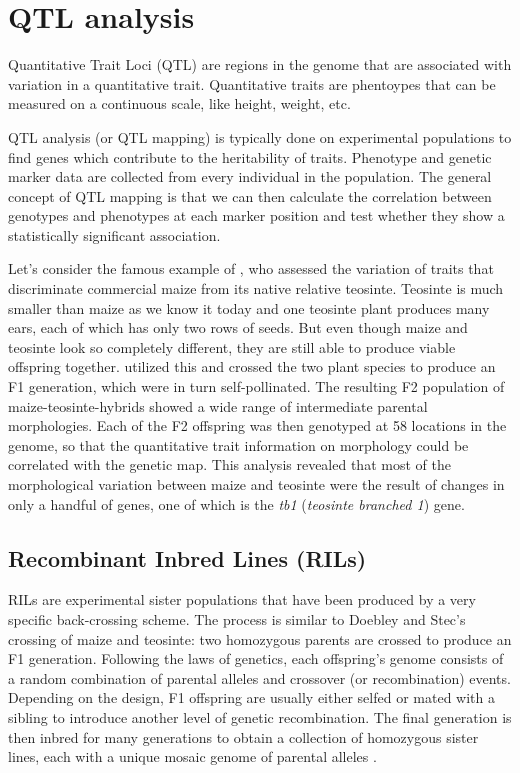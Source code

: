 \documentclass[12pt,]{krantz}
\begin{document}
\section{QTL analysis}\label{qtl-analysis}

Quantitative Trait Loci (QTL) are regions in the genome that are
associated with variation in a quantitative trait. Quantitative traits
are phentoypes that can be measured on a continuous scale, like height,
weight, etc.

QTL analysis (or QTL mapping) is typically done on experimental
populations to find genes which contribute to the heritability of
traits. Phenotype and genetic marker data are collected from every
individual in the population. The general concept of QTL mapping is that
we can then calculate the correlation between genotypes and phenotypes
at each marker position and test whether they show a statistically
significant association.

Let's consider the famous example of \citet{Doebley285}, who assessed
the variation of traits that discriminate commercial maize from its
native relative teosinte. Teosinte is much smaller than maize as we know
it today and one teosinte plant produces many ears, each of which has
only two rows of seeds. But even though maize and teosinte look so
completely different, they are still able to produce viable offspring
together. \citet{Doebley285} utilized this and crossed the two plant
species to produce an F1 generation, which were in turn self-pollinated.
The resulting F2 population of maize-teosinte-hybrids showed a wide
range of intermediate parental morphologies. Each of the F2 offspring
was then genotyped at 58 locations in the genome, so that the
quantitative trait information on morphology could be correlated with
the genetic map. This analysis revealed that most of the morphological
variation between maize and teosinte were the result of changes in only
a handful of genes, one of which is the \emph{tb1} (\emph{teosinte
branched 1}) gene.

\subsection{Recombinant Inbred Lines
(RILs)}\label{recombinant-inbred-lines-rils}

RILs are experimental sister populations that have been produced by a
very specific back-crossing scheme. The process is similar to Doebley
and Stec's crossing of maize and teosinte: two homozygous parents are
crossed to produce an F1 generation. Following the laws of genetics,
each offspring's genome consists of a random combination of parental
alleles and crossover (or recombination) events. Depending on the
design, F1 offspring are usually either selfed or mated with a sibling
to introduce another level of genetic recombination. The final
generation is then inbred for many generations to obtain a collection of
homozygous sister lines, each with a unique mosaic genome of parental
alleles \citep{Pollard2012}.
\end{document}
